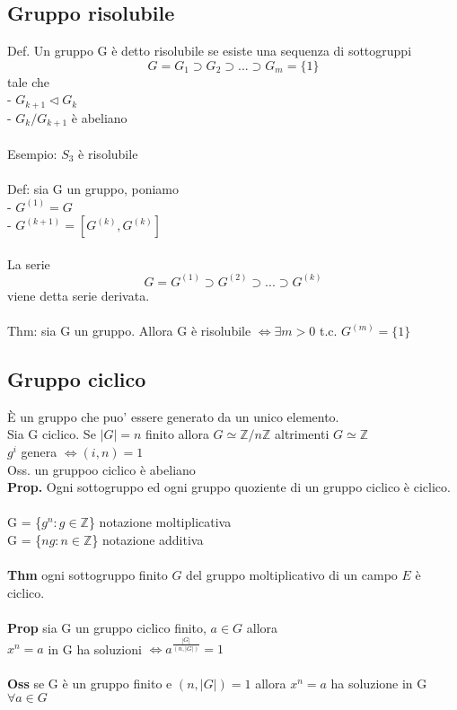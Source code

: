 \documentclass[10pt,a4paper]{article}
\begin{document}
\subsection{Gruppo risolubile}

Def. Un gruppo G è detto risolubile se esiste una sequenza di sottogruppi\\
$$ G=G_1 \supset G_2 \supset ... \supset G_m =\{1\} $$ tale che\\
- $G_{k+1} \lhd G_k$\\
- $ G_k/G_{k+1} $ è abeliano\\\\
Esempio: $S_3$ è risolubile\\\\
Def: sia G un gruppo, poniamo\\
- $G^{(1)} = G$\\
- $G^{(k+1)}=[G^{(k)},G^{(k)}]$\\\\
La serie
$$ G = G^{(1)} \supset G^{(2)} \supset ... \supset G^{(k)}$$
viene detta serie derivata.\\\\
Thm: sia G un gruppo. Allora G è risolubile $\iff \exists m>0$ t.c. $G^{(m)}=\{1\}$
\subsection{Gruppo ciclico}
È un gruppo che puo' essere generato da un unico elemento.\\
Sia G ciclico. Se $|G | = n$ finito allora $G \simeq \mathbb{Z}/n\mathbb{Z}$ altrimenti $ G \simeq \mathbb{Z}$\\
$g^i$ genera $\iff (i,n)=1$\\
Oss. un gruppoo ciclico è abeliano\\
\textbf{Prop.} Ogni sottogruppo ed ogni gruppo quoziente di un gruppo ciclico è ciclico.
\\\\
G = \{$g^n : g \in \mathbb{Z}$\} notazione moltiplicativa\\
G = \{$ng : n\in\mathbb{Z}$\} notazione additiva\\\\
\textbf{Thm} ogni sottogruppo finito $G$ del gruppo moltiplicativo di un campo $E$ è ciclico.\\\\
\textbf{Prop} sia G un gruppo ciclico finito, $a \in G$ allora\\ $x^n = a$ in G ha soluzioni $\iff a^{\frac{|G|}{(n,|G|)}} = 1$\\\\
\textbf{Oss} se G è un gruppo finito e $(n,|G|)=1$ allora $x^n=a$ ha soluzione in G $\forall a \in G$
\end{document}
